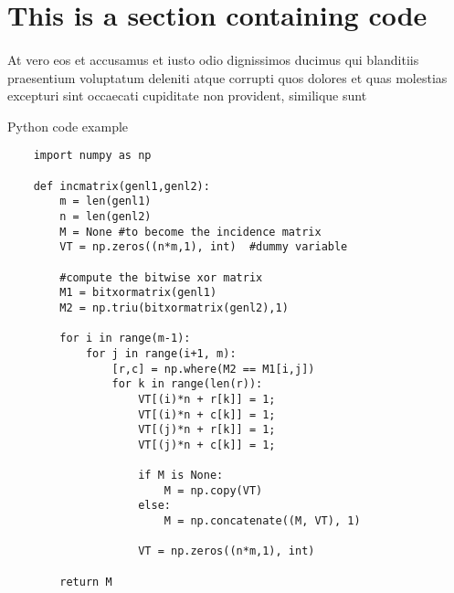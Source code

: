 \section{This is a section containing code}
    \paragraph{}
    At vero eos et accusamus et iusto odio dignissimos ducimus qui blanditiis praesentium voluptatum deleniti atque
    corrupti quos dolores et quas molestias excepturi sint occaecati cupiditate non provident, similique sunt 

    \begin{listing}[ht]
    \caption{Python code example}
    \label{listing:python example}

    \begin{verbatim}
    import numpy as np
        
    def incmatrix(genl1,genl2):
        m = len(genl1)
        n = len(genl2)
        M = None #to become the incidence matrix
        VT = np.zeros((n*m,1), int)  #dummy variable
        
        #compute the bitwise xor matrix
        M1 = bitxormatrix(genl1)
        M2 = np.triu(bitxormatrix(genl2),1) 
        
        for i in range(m-1):
            for j in range(i+1, m):
                [r,c] = np.where(M2 == M1[i,j])
                for k in range(len(r)):
                    VT[(i)*n + r[k]] = 1;
                    VT[(i)*n + c[k]] = 1;
                    VT[(j)*n + r[k]] = 1;
                    VT[(j)*n + c[k]] = 1;
        
                    if M is None:
                        M = np.copy(VT)
                    else:
                        M = np.concatenate((M, VT), 1)
        
                    VT = np.zeros((n*m,1), int)
        
        return M
    \end{verbatim}
    \end{listing}

\newpage
